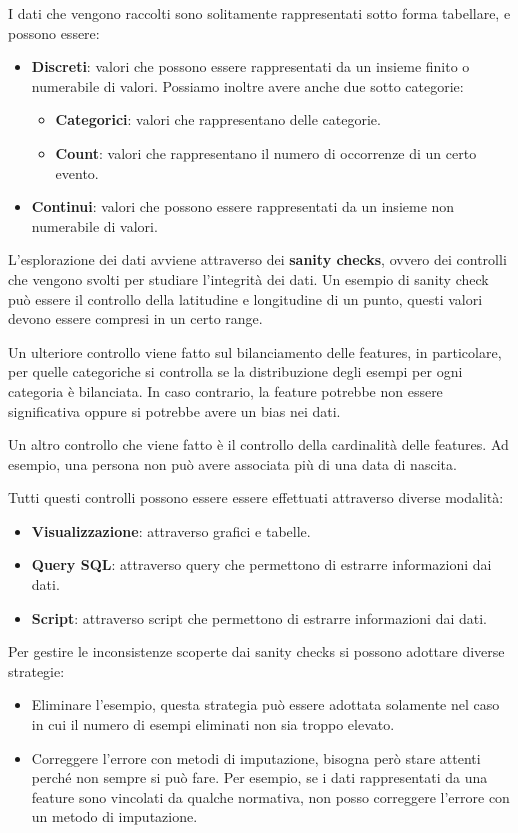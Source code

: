 I dati che vengono raccolti sono solitamente rappresentati sotto forma tabellare,
e possono essere:
\begin{itemize}
      \item \textbf{Discreti}: valori che possono essere rappresentati da un insieme
            finito o numerabile di valori. Possiamo inoltre avere anche due sotto
            categorie:
            \begin{itemize}
                  \item \textbf{Categorici}: valori che rappresentano delle categorie.
                  \item \textbf{Count}: valori che rappresentano il numero di
                        occorrenze di un certo evento.
            \end{itemize}
      \item \textbf{Continui}: valori che possono essere rappresentati da un insieme
            non numerabile di valori.
\end{itemize}
L'esplorazione dei dati avviene attraverso dei \textbf{sanity checks}, ovvero dei
controlli che vengono svolti per studiare l'integrità dei dati. Un esempio di sanity
check può essere il controllo della latitudine e longitudine di un punto, questi
valori devono essere compresi in un certo range.

Un ulteriore controllo viene fatto sul bilanciamento delle features, in particolare,
per quelle categoriche si controlla se la distribuzione degli esempi per ogni
categoria è bilanciata. In caso contrario, la feature potrebbe non essere significativa
oppure si potrebbe avere un bias nei dati.

Un altro controllo che viene fatto è il controllo della cardinalità delle features.
Ad esempio, una persona non può avere associata più di una data di nascita.

Tutti questi controlli possono essere essere effettuati attraverso diverse modalità:
\begin{itemize}
      \item \textbf{Visualizzazione}: attraverso grafici e tabelle.
      \item \textbf{Query SQL}: attraverso query che permettono di estrarre
            informazioni dai dati.
      \item \textbf{Script}: attraverso script che permettono di estrarre
            informazioni dai dati.
\end{itemize}

Per gestire le inconsistenze scoperte dai sanity checks si possono adottare diverse
strategie:
\begin{itemize}
      \item Eliminare l'esempio, questa strategia può essere adottata solamente
            nel caso in cui il numero di esempi eliminati non sia troppo elevato.
      \item Correggere l'errore con metodi di imputazione, bisogna però stare
            attenti perché non sempre si può fare. Per esempio, se i dati
            rappresentati da una feature sono vincolati da qualche normativa,
            non posso correggere l'errore con un metodo di imputazione.
\end{itemize}

